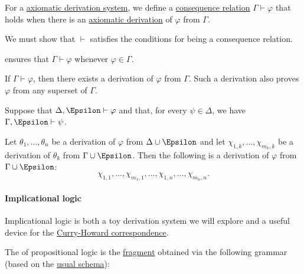 \begin{definition}\label{def:axiomatic_derivation_entailment}
  For a \hyperref[def:axiomatic_derivation_system]{axiomatic derivation system}, we define a \hyperref[def:consequence_relation]{consequence relation} \( \Gamma \vdash \varphi \) that holds when there is an \hyperref[def:axiomatic_derivation]{axiomatic derivation} of \( \varphi \) from \( \Gamma \).
\end{definition}
\begin{defproof}
  We must show that \( {\vdash} \) satisfies the conditions for being a consequence relation.

    ensures that \( \Gamma \vdash \varphi \) whenever \( \varphi \in \Gamma \).

   If \( \Gamma \vdash \varphi \), then there exists a derivation of \( \varphi \) from \( \Gamma \). Such a derivation also proves \( \varphi \) from any superset of \( \Gamma \).

   Suppose that \( \Delta, \Epsilon \vdash \varphi \) and that, for every \( \psi \in \Delta \), we have \( \Gamma, \Epsilon \vdash \psi \).

  Let \( \theta_1, \ldots, \theta_n \) be a derivation of \( \varphi \) from \( \Delta \cup \Epsilon \) and let \( \chi_{1,k}, \ldots, \chi_{m_k,k} \) be a derivation of \( \theta_k \) from \( \Gamma \cup \Epsilon \). Then the following is a derivation of \( \varphi \) from \( \Gamma \cup \Epsilon \):
  \begin{equation*}
    \chi_{1,1}, \ldots, \chi_{m_1,1}, \ldots, \chi_{1,n}, \ldots, \chi_{m_n,n}.
  \end{equation*}
\end{defproof}

\paragraph{Implicational logic}\hfill

Implicational logic is both a toy derivation system we will explore and a useful device for the \hyperref[con:curry_howard_correspondence]{Curry-Howard correspondence}.

\begin{definition}\label{def:implicational_propositional_fragment}
  The  of propositional logic is the \hyperref[def:propositional_syntax/fragment]{fragment} obtained via the following grammar (based on the \hyperref[def:propositional_syntax]{usual schema}):
  \begin{bnf*}
     { \bnfor \bnftsq{(} \bnfsp {} \bnfsp \bnftsq{\( \synimplies \)} \bnfsp {} \bnfsp \bnftsq{)}}
  \end{bnf*}
\end{definition}

